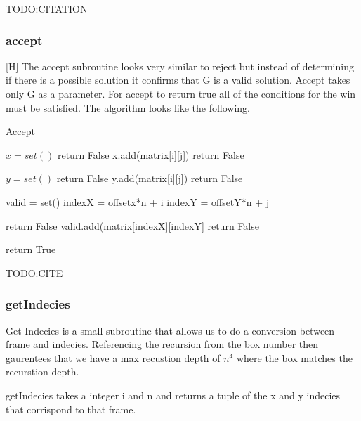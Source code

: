 \documentclass{sig-alternate}
\begin{document}
TODO:CITATION

\subsubsection{accept}[H]
The accept subroutine looks very similar to reject but instead of determining if there is a possible solution it confirms that G is a valid solution. Accept takes only G as a parameter. For accept to return true all of the conditions for the win must be satisfied. The algorithm looks like the following.

\begin{algorithm}[H]
\caption{Accept}\label{accept}
\begin{algorithmic}[1]

\State $x = set()$
\State return False
\EndIf
\State x.add(matrix[i][j])
\Else
\State return False
\EndIf
\EndFor
\EndFor

\State $y = set()$
\State return False
\EndIf
\State y.add(matrix[i][j])
\Else
\State return False
\EndIf
\EndFor
\EndFor

\State valid = set()
\State indexX = offsetx*n + i
\State indexY = offsetY*n + j

\State return False
\EndIf
\State valid.add(matrix[indexX][indexY]
\Else
\State return False
\EndIf
    
\EndFor
\EndFor
\EndFor
\EndFor
\State return True
\EndProcedure
\end{algorithmic}
\end{algorithm}
TODO:CITE

\subsubsection{getIndecies}
Get Indecies is a small subroutine that allows us to do a conversion between frame and indecies. Referencing the
recursion from the box number then gaurentees that we have a max recustion depth of $n^4$ where the box matches the recurstion depth. 

getIndecies takes a integer i and n and returns a tuple of the x and y indecies that corrispond to that frame.
\end{document}
